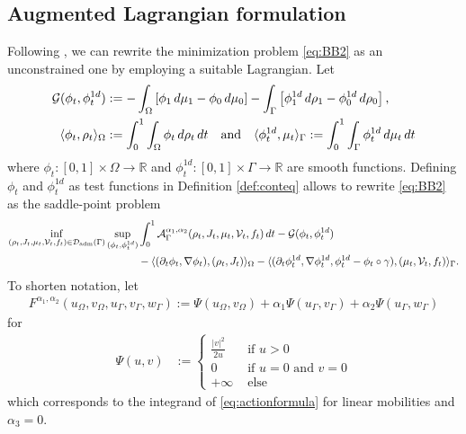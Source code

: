 \documentclass{article}
\def\R{{\mathbb R}}
\def\calA{{\mathcal A}} \def\calB{{\mathcal B}} \def\calC{{\mathcal C}}
\def\calG{{\mathcal G}} \def\calH{{\mathcal H}} \def\calI{{\mathcal I}}
\DeclarePairedDelimiter{\skp}{\langle}{\rangle}
\begin{document}
\subsection{Augmented Lagrangian formulation}\label{derivAugmLagr}
Following \cite{fu_high_2023}, we can rewrite the minimization problem \eqref{eq:BB2} as an unconstrained one by employing a suitable Lagrangian.
Let 
\begin{align*}
    \calG(\phi_t, \phi_t^{1d}) &:= -\int_\Omega \left[ \phi_1\, d\mu_1 - \phi_0\, d\mu_0 \right] -\int_\Gamma \left[ \phi^{1d}_1\, d\rho_1 - \phi^{1d}_0\, d\rho_0 \right], \\
    \skp{\phi_t, \rho_t}_\Omega &:=\int_{0}^1 \int_\Omega \phi_t \, d\rho_t \, dt \quad \text{and} \quad 
    \skp{\phi^{1d}_t, \mu_t}_\Gamma := \int_{0}^1 \int_\Gamma \phi^{1d}_t\, d\mu_t \, dt
\end{align*}
where $\phi_t : [0,1]\times \Omega \rightarrow \R$ and $\phi^{1d}_t : [0,1]\times\Gamma \rightarrow \R$ are smooth functions. 
Defining $\phi_t$ and $\phi_t^{1d}$ as test functions in Definition \ref{def:conteq} allows to rewrite \eqref{eq:BB2} as the saddle-point problem
\begin{align*}
    \inf\limits_{(\rho_t, J_t, \mu_t, \mathcal{V}_t, f_t) \in \mathcal{D}_{\rm adm}(\Gamma)} \sup\limits_{(\phi_t, \phi^{1d}_t)} &\int_0^1 \calA_\Gamma^{\alpha_1, \alpha_2}(\rho_t, J_t, \mu_t, \mathcal{V}_t, f_t)  \, dt - \calG(\phi_t, \phi^{1d}_t) \\
    &- \skp{(\partial_t\phi_t,\nabla\phi_t),(\rho_t, J_t)}_\Omega - \skp{(\partial_t\phi^{1d}_t, \nabla\phi^{1d}_t, \phi^{1d}_t-\phi_t\circ\gamma),(\mu_t, {\mathcal{V}_t}, f_t)}_\Gamma .
\end{align*}
To shorten notation, let
\begin{align*}
    F^{\alpha_1, \alpha_2}(u_\Omega, v_\Omega, u_\Gamma,v_\Gamma, w_\Gamma) := \Psi(u_\Omega, v_\Omega) + \alpha_1 \Psi(u_\Gamma,v_\Gamma) + \alpha_2 \Psi(u_\Gamma,w_\Gamma)
\end{align*}
for 
\begin{align*}
    \Psi(u,v) &:= \begin{cases}
        \frac{|v|^2}{2u} &\text{ if }  u>0\\
        0 &\text{ if } u=0 \text{ and } v=0\\
        +\infty &\text{ else}
    \end{cases}
\end{align*}
which corresponds to the integrand of \eqref{eq:actionformula} for linear mobilities and $\alpha_3=0$. 
\end{document}
